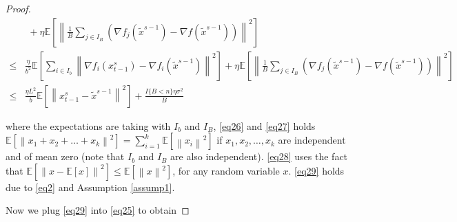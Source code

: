\documentclass{article}
\newcommand*{\E}{\mathbb{E}}
\newcommand{\norm}[1]{\left\lVert#1\right\rVert}
\theoremstyle{definition}
\theoremstyle{remark}
\begin{document}
\begin{proof}
\begin{align}
   &\,\, \label{eq27}+ \eta \E \left[ \norm{\frac{1}{B}\sum_{j\in I_B}\left(\nabla f_j(\widetilde{x}^{s-1}) - \nabla f(\tilde{x}^{s-1})\right)}^2\right]\\
   \leq  &\label{eq28}\frac{\eta}{b^2}\E\left[\sum_{i\in I_b}\norm{\nabla f_i(x_{t-1}^s)-\nabla f_i(\widetilde{x}^{s-1})}^2\right]+ \eta \E \left[ \norm{\frac{1}{B}\sum_{j\in I_B}\left(\nabla f_j(\widetilde{x}^{s-1}) - \nabla f(\tilde{x}^{s-1})\right)}^2\right]\\
   \leq  &\label{eq29}\frac{\eta L^2}{b}\E\left[\norm{x_{t-1}^s-\widetilde{x}^{s-1}}^2\right]+ \frac{I\{B < n\}\eta \sigma ^2}{B}
 \end{align}

 where the expectations are taking with $I_b$ and $I_B$, \eqref{eq26} and \eqref{eq27} holds $\E[\norm{x_1+x_2+\ldots+x_k}^2] = \sum_{i=1}^k \E[\norm{x_i}^2]$ if $x_1,x_2,\ldots,x_k$ are independent and of mean zero (note that $I_b$ and $I_B$ are also independent). \eqref{eq28} uses the fact that $\E[\norm{x-\E[x]}^2] \leq \E[\norm{x}^2]$, for any random variable $x$. \eqref{eq29} holds due to \eqref{eq2} and Assumption \ref{assump1}. 
 
 Now we plug \eqref{eq29} into \eqref{eq25} to obtain


\end{proof}
\end{document}
